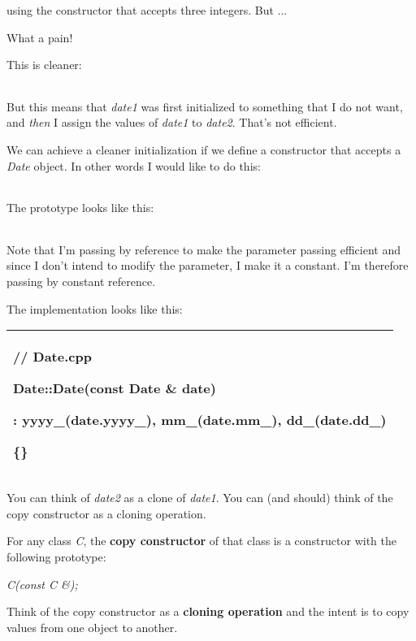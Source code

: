 \documentclass[
]{article}
\begin{document}
using the constructor that accepts three integers. But ...

What a pain!

This is cleaner:

\begin{longtable}[]{@{}@{}}
\toprule
\endhead
\bottomrule
\end{longtable}

But this means that \emph{date1} was first initialized to something that
I do not want, and \emph{then} I assign the values of \emph{date1} to
\emph{date2}. That's not efficient.

We can achieve a cleaner initialization if we define a constructor that
accepts a \emph{Date} object. In other words I would like to do this:

\begin{longtable}[]{@{}@{}}
\toprule
\endhead
\bottomrule
\end{longtable}

The prototype looks like this:

\begin{longtable}[]{@{}@{}}
\toprule
\endhead
\bottomrule
\end{longtable}

Note that I'm passing by reference to make the parameter passing
efficient and since I don't intend to modify the parameter, I make it a
constant. I'm therefore passing by constant reference.

The implementation looks like this:

\begin{longtable}[]{@{}l@{}}
\toprule
\endhead
\begin{minipage}[t]{0.97\columnwidth}\raggedright
// Date.cpp

Date::Date(const Date \& date)

: yyyy\_(date.yyyy\_), mm\_(date.mm\_), dd\_(date.dd\_)

\{\}\strut
\end{minipage}\tabularnewline
\bottomrule
\end{longtable}

You can think of \emph{date2} as a clone of \emph{date1}. You can (and
should) think of the copy constructor as a cloning operation.

For any class \emph{C}, the \textbf{copy constructor} of that class is a
constructor with the following prototype:

\emph{C(const C \&); }

Think of the copy constructor as a \textbf{cloning operation} and the
intent is to copy values from one object to another.
\end{document}
